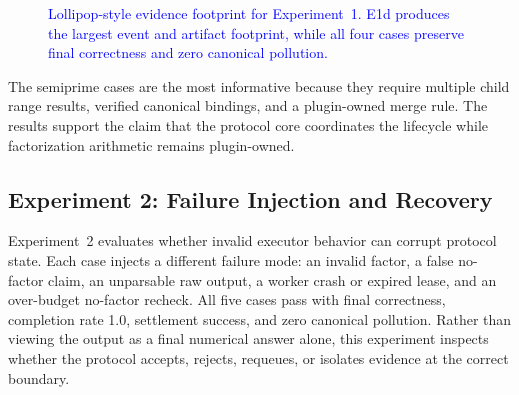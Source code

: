 \documentclass{article}
\theoremstyle{plain}
\begin{document}
\begin{figure}[!htbp]
\centering
{\color{blue}
}
\caption{\textcolor{blue}{Lollipop-style evidence footprint for Experiment~1. E1d produces the largest event and artifact footprint, while all four cases preserve final correctness and zero canonical pollution.}}
\label{fig:factorization-lollipop}
\end{figure}

The semiprime cases are the most informative because they require multiple child
range results, verified canonical bindings, and a plugin-owned merge rule. The
results support the claim that the protocol core coordinates the lifecycle while
factorization arithmetic remains plugin-owned.

\FloatBarrier

\subsection{Experiment 2: Failure Injection and Recovery}
\label{subsec:exp2-failure}

Experiment~2 evaluates whether invalid executor behavior can corrupt protocol
state. Each case injects a different failure mode: an invalid factor, a false
no-factor claim, an unparsable raw output, a worker crash or expired lease, and
an over-budget no-factor recheck. All five cases pass with final correctness,
completion rate 1.0, settlement success, and zero canonical pollution. Rather
than viewing the output as a final numerical answer alone, this experiment
inspects whether the protocol accepts, rejects, requeues, or isolates evidence at
the correct boundary.
\end{document}
